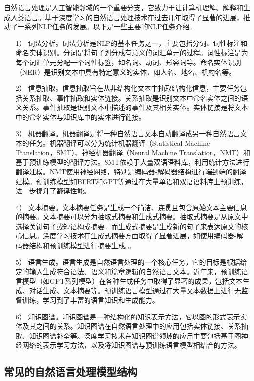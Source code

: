 自然语言处理是人工智能领域的一个重要分支，它致力于让计算机理解、解释和生成人类语言。基于深度学习的自然语言处理技术在过去几年取得了显著的进展，推动了一系列NLP任务的发展。以下是一些主要的NLP任务介绍。

\begin{itemize}
	\item [1）]
	词法分析。词法分析是NLP的基本任务之一，主要包括分词、词性标注和命名实体识别。分词是将句子划分成有意义的词汇单元的过程。词性标注是为每个词汇单元分配一个词性标签，如名词、动词、形容词等。命名实体识别（NER）是识别文本中具有特定意义的实体，如人名、地名、机构名等。
	\item [2）]
	信息抽取。信息抽取旨在从非结构化文本中抽取结构化信息，主要任务包括关系抽取、事件抽取和实体链接。关系抽取是识别文本中命名实体之间的语义关系。事件抽取是识别文本中描述的事件及其相关实体。实体链接是将文本中的命名实体与知识库中的实体进行链接。
	\item [3）]
	机器翻译。机器翻译是将一种自然语言文本自动翻译成另一种自然语言文本的任务。机器翻译可以分为统计机器翻译（Statistical Machine Translation，SMT）、神经机器翻译（Neural Machine Translation，NMT）和基于预训练模型的翻译方法。SMT依赖于大量双语语料库，利用统计方法进行翻译建模。NMT使用神经网络，特别是编码器-解码器结构进行端到端的翻译建模。预训练模型如BERT\cite{BERT}和GPT\cite{GPT2, GPT3}等通过在大量单语和双语语料库上预训练，进一步提升了翻译性能。
	\item [4）]
	文本摘要。文本摘要任务是生成一个简洁、连贯且包含原始文本主要信息的摘要。文本摘要可以分为抽取式摘要和生成式摘要。抽取式摘要是从原文中选择关键句子或短语构成摘要，而生成式摘要是生成新的句子来表达原文的核心信息。深度学习技术在生成式摘要方面取得了显著进展，如使用编码器-解码器结构和预训练模型进行摘要生成。。
	\item [5）]
	语言生成。语言生成是自然语言处理的一个核心任务，它的目标是根据给定的输入生成符合语法、语义和篇章逻辑的自然语言文本。近年来，预训练语言模型（如GPT系列模型）在各种生成任务中取得了显著的成果，包括文本生成、对话生成、文本摘要等。预训练语言模型通过在大量文本数据上进行无监督训练，学习到了丰富的语言知识和生成能力。
	\item [6）]
	知识图谱。知识图谱是一种结构化的知识表示方法，它以图的形式表示实体及其之间的关系。知识图谱在自然语言处理中的应用包括实体链接、关系抽取、知识图谱补全等。深度学习技术在知识图谱领域的应用主要包括基于图神经网络的表示学习方法，以及将知识图谱与预训练语言模型相结合的方法。
\end{itemize}


\subsection{常见的自然语言处理模型结构}

